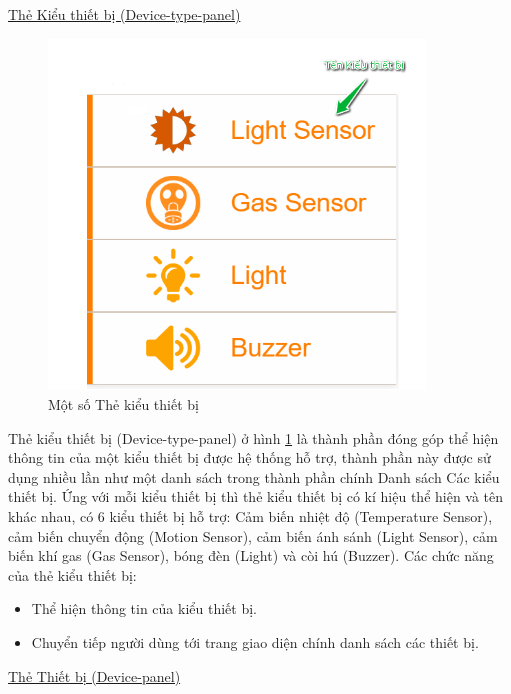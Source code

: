 \documentclass[12pt,a4paper,oneside]{extbook}
\begin{document}
\underline{Thẻ Kiểu thiết bị (Device-type-panel)}

\begin{figure}[h]
  \centering
     \includegraphics[width=10cm]{6-device-type-panels}
  \caption{Một số Thẻ kiểu thiết bị}\label{fig:6-device-type-panels}
\end{figure}

Thẻ kiểu thiết bị (Device-type-panel) ở hình \ref{fig:6-device-type-panels} là thành phần đóng góp thể hiện thông tin của một kiểu thiết bị được hệ thống hỗ trợ, thành phần này được sử dụng nhiều lần như một danh sách trong thành phần chính Danh sách Các kiểu thiết bị. Ứng với mỗi kiểu thiết bị thì thẻ kiểu thiết bị có kí hiệu thể hiện và tên khác nhau, có 6 kiểu thiết bị hỗ trợ: Cảm biến nhiệt độ (Temperature Sensor), cảm biến chuyển động (Motion Sensor), cảm biến ánh sánh (Light Sensor), cảm biến khí gas (Gas Sensor), bóng đèn (Light) và còi hú (Buzzer). Các chức năng của thẻ kiểu thiết bị:

\begin{itemize}[topsep=1mm,itemsep=-0.5mm]
\item Thể hiện thông tin của kiểu thiết bị.
\item Chuyển tiếp người dùng tới trang giao diện chính danh sách các thiết bị.
\vspace{1mm}
\end{itemize}

\underline{Thẻ Thiết bị (Device-panel)}
\end{document}
